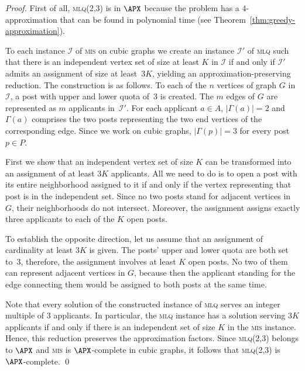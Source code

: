 \documentclass{llncs}
\begin{document}
\begin{proof}
	First of all, \textsc{mlq(2,3)} is in $\APX$ because the problem has a $4$-approx\-ima\-tion that can be found in polynomial time (see Theorem~\ref{thm:greedy-approximation}).
	
	To each instance $\mathcal{I}$ of \textsc{mis} on cubic graphs we create an instance $\mathcal{I}'$ of \textsc{mlq} such that there is an independent vertex set of size at least $K$ in $\mathcal{I}$ if and only if $\mathcal{I}'$ admits an assignment of size at least~$3K$, yielding an approximation-preserving reduction.  The construction is as follows. To each of the $n$ vertices of graph $G$ in~$\mathcal{I}$, a post with upper and lower quota of~3 is created. The $m$ edges of $G$ are represented as $m$ applicants in~$\mathcal{I}'$. For each applicant $a \in A$, $|\Gamma(a)| =2$ and $\Gamma(a)$ comprises the two posts representing the two end vertices of the corresponding edge. Since we work on cubic graphs, $|\Gamma(p)| = 3$ for every post~$p \in P$.
	
	First we show that an independent vertex set of size $K$ can be transformed into an assignment of at least $3K$ applicants. All we need to do is to open a post with its entire neighborhood assigned to it if and only if the vertex representing that post is in the independent set. Since no two posts stand for adjacent vertices in~$G$, their neighborhoods do not intersect. Moreover, the assignment assigns exactly three applicants to each of the $K$ open posts.
	
	To establish the opposite direction, let us assume that an assignment of cardinality at least $3K$ is given. The posts' upper and lower quota are both set to~3, therefore, the assignment involves at least $K$ open posts. No two of them can represent adjacent vertices in $G$, because then the applicant standing for the edge connecting them would be assigned to both posts at the same time.
    
Note that every solution of the constructed instance of \textsc{mlq} serves an integer multiple of 3 applicants. In particular, the \textsc{mlq} instance has a solution serving $3K$ applicants if and only if there is an independent set of size $K$ in the \textsc{mis} instance. Hence, this reduction  preserves the approximation factors. Since \textsc{mlq(2,3)} belongs to $\APX$ and \textsc{mis} is $\APX$-complete in cubic graphs, it follows that \textsc{mlq(2,3)} is $\APX$-complete.
\qed
\end{proof}
\end{document}
